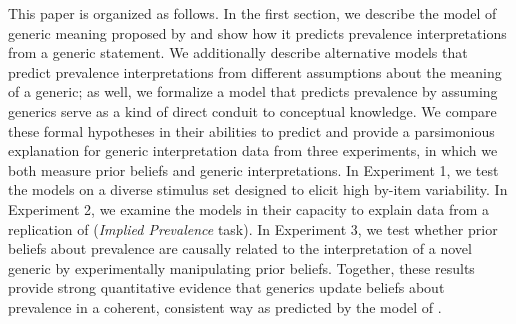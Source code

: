 \documentclass[floatsintext,doc]{apa6}
\begin{document}
%

This paper is organized as follows.
In the first section, we describe the model of generic meaning proposed by  and show how it predicts prevalence interpretations from a generic statement.
We additionally describe alternative models that predict prevalence interpretations from different assumptions about the meaning of a generic; as well, we formalize a model that predicts prevalence by assuming generics serve as a kind of direct conduit to conceptual knowledge.
We compare these formal hypotheses in their abilities to predict and provide a parsimonious explanation for generic interpretation data from three experiments, in which we both measure prior beliefs and generic interpretations.
In Experiment 1, we test the models on a diverse stimulus set designed to elicit high by-item variability.
In Experiment 2, we examine the models in their capacity to explain data from a replication of  (\emph{Implied Prevalence} task).
In Experiment 3, we test whether prior beliefs about prevalence are causally related to the interpretation of a novel generic by experimentally manipulating prior beliefs.
Together, these results provide strong quantitative evidence that generics update beliefs about prevalence in a coherent, consistent way as predicted by the model of .
\end{document}
